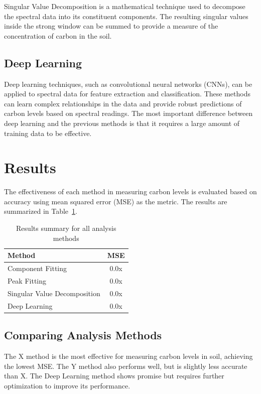 \documentclass[review]{elsarticle}
\begin{document}
Singular Value Decomposition is a mathematical technique used to decompose the spectral data into its constituent components. The resulting singular values inside the strong window can be summed to provide a measure of the concentration of carbon in the soil.

\subsection{Deep Learning}

Deep learning techniques, such as convolutional neural networks (CNNs), can be applied to spectral data for feature extraction and classification. These methods can learn complex relationships in the data and provide robust predictions of carbon levels based on spectral readings. The most important difference between deep learning and the previous methods is that it requires a large amount of training data to be effective.

\section{Results}

The effectiveness of each method in measuring carbon levels is evaluated based on accuracy using mean squared error (MSE) as the metric. The results are summarized in Table~\ref{tab:results_summary}.

\begin{table}[H]
\centering
\caption{Results summary for all analysis methods}
\label{tab:results_summary}
\begin{tabular}{@{}lc@{}}
\toprule
Method & MSE \\
\midrule
Component Fitting & 0.0x \\
Peak Fitting & 0.0x \\
Singular Value Decomposition & 0.0x \\
Deep Learning & 0.0x \\
\bottomrule
\end{tabular}
\end{table}

\subsection{Comparing Analysis Methods}

The X method is the most effective for measuring carbon levels in soil, achieving the lowest MSE. The Y method also performs well, but is slightly less accurate than X. The Deep Learning method shows promise but requires further optimization to improve its performance.
\end{document}
